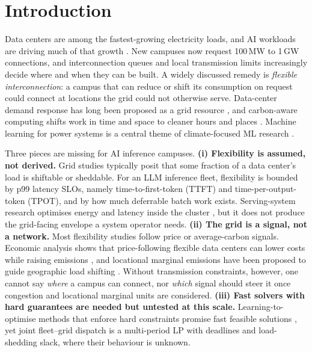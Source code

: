 \documentclass{article} %
\begin{document}
\section{Introduction}
\label{sec:intro}
Data centers are among the fastest-growing electricity loads, and AI workloads are driving much of that growth \citep{masanet2020recalibrating,wu2022sustainable}. New campuses now request 100\,MW to 1\,GW connections, and interconnection queues and local transmission limits increasingly decide where and when they can be built. A widely discussed remedy is \emph{flexible interconnection}: a campus that can reduce or shift its consumption on request could connect at locations the grid could not otherwise serve. Data-center demand response has long been proposed as a grid resource \citep{wierman2014opportunities}, and carbon-aware computing shifts work in time and space to cleaner hours and places \citep{radovanovic2023carbon,wiesner2021letswait,hanafy2024carbonscaler}. Machine learning for power systems is a central theme of climate-focused ML research \citep{rolnick2022tackling}.

Three pieces are missing for AI inference campuses. \textbf{(i) Flexibility is assumed, not derived.} Grid studies typically posit that some fraction of a data center's load is shiftable or sheddable. For an LLM inference fleet, flexibility is bounded by p99 latency SLOs, namely time-to-first-token (TTFT) and time-per-output-token (TPOT), and by how much deferrable batch work exists. Serving-system research optimises energy and latency inside the cluster \citep{kwon2023pagedattention,patel2024splitwise,stojkovic2025dynamollm,you2023zeus}, but it does not produce the grid-facing envelope a system operator needs. \textbf{(ii) The grid is a signal, not a network.} Most flexibility studies follow price or average-carbon signals. Economic analysis shows that price-following flexible data centers can lower costs while raising emissions \citep{knittel2025flexible}, and locational marginal emissions have been proposed to guide geographic load shifting \citep{lindberg2021environmental,zhang2022remunerating}. Without transmission constraints, however, one cannot say \emph{where} a campus can connect, nor \emph{which} signal should steer it once congestion and locational marginal units are considered. \textbf{(iii) Fast solvers with hard guarantees are needed but untested at this scale.} Learning-to-optimise methods that enforce hard constraints promise fast feasible solutions \citep{donti2021dc3,tabas2022safe,li2023loop}, yet joint fleet--grid dispatch is a multi-period LP with deadlines and load-shedding slack, where their behaviour is unknown.
\end{document}
